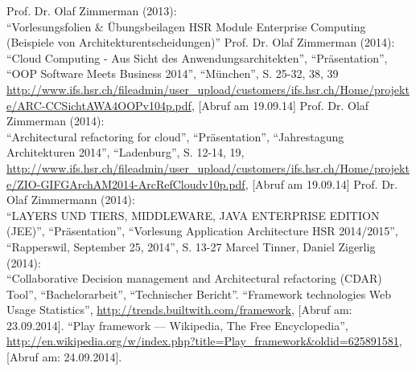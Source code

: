 \begin{thebibliography}{literatur}
	 Prof. Dr. Olaf Zimmerman (2013): \\
		"`Vorlesungsfolien \& Übungsbeilagen HSR Module Enterprise Computing (Beispiele von Architekturentscheidungen)"'
	 Prof. Dr. Olaf Zimmerman (2014): \\
		"`Cloud Computing - Aus Sicht des Anwendungsarchitekten"', "`Präsentation"', "`OOP Software Meets Business 2014"', "`München"', S. 25-32, 38, 39
		\url{http://www.ifs.hsr.ch/fileadmin/user\_upload/customers/ifs.hsr.ch/Home/projekte/ARC-CCSichtAWA4OOPv104p.pdf}, 
		[Abruf am 19.09.14]
	 Prof. Dr. Olaf Zimmerman (2014): \\
		"`Architectural refactoring for cloud"', "`Präsentation"', "`Jahrestagung Architekturen 2014"', "`Ladenburg"', S. 12-14, 19,
		\url{http://www.ifs.hsr.ch/fileadmin/user\_upload/customers/ifs.hsr.ch/Home/projekte/ZIO-GIFGArchAM2014-ArcRefCloudv10p.pdf}, 
		[Abruf am 19.09.14]
	 Prof. Dr. Olaf Zimmermann (2014): \\
		"`LAYERS UND TIERS, MIDDLEWARE, JAVA ENTERPRISE EDITION (JEE)"', "`Präsentation"', "`Vorlesung Application Architecture HSR 2014/2015"', "`Rapperswil, September 25, 2014"', S. 13-27
	 Marcel Tinner, Daniel Zigerlig (2014): \\
		"`Collaborative Decision management and Architectural refactoring (CDAR) Tool"', "`Bachelorarbeit"', "`Technischer Bericht"'.
	 "`Framework technologies Web Usage Statistics"',
		\url{http://trends.builtwith.com/framework}, [Abruf am: 23.09.2014].
	 "`Play framework --- Wikipedia{,} The Free Encyclopedia"',
		\url{http://en.wikipedia.org/w/index.php?title=Play_framework&oldid=625891581}, [Abruf am: 24.09.2014].

\end{thebibliography}
